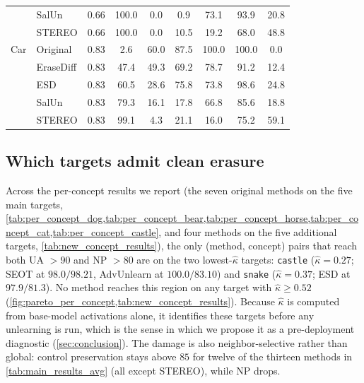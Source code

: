 \begin{table}[htbp]
{\begin{tabular}{llccccccc}
& SalUn     & 0.66 & 100.0 & 0.0 & 0.9 & 73.1 & 93.9 & 20.8 \\
& STEREO    & 0.66 & 100.0 & 0.0 & 10.5 & 19.2 & 68.0 & 48.8 \\
\midrule
Car
& Original  & 0.83 & 2.6 & 60.0 & 87.5 & 100.0 & 100.0 & 0.0 \\
& EraseDiff & 0.83 & 47.4 & 49.3 & 69.2 & 78.7 & 91.2 & 12.4 \\
& ESD       & 0.83 & 60.5 & 28.6 & 75.8 & 73.8 & 98.6 & 24.8 \\
& SalUn     & 0.83 & 79.3 & 16.1 & 17.8 & 66.8 & 85.6 & 18.8 \\
& STEREO    & 0.83 & 99.1 & 4.3 & 21.1 & 16.0 & 75.2 & 59.1 \\
\bottomrule
\end{tabular}
}
\end{table}

\subsection{Which targets admit clean erasure}\label{app:clean-erasure}
Across the per-concept results we report (the seven original methods on the
five main targets, \cref{tab:per_concept_dog,tab:per_concept_bear,tab:per_concept_horse,tab:per_concept_cat,tab:per_concept_castle}, and four methods on the five additional
targets, \cref{tab:new_concept_results}), the only (method, concept) pairs that reach both
UA $>90$ and NP $>80$ are on the two lowest-$\hat\kappa$ targets:
\texttt{castle} ($\hat\kappa=0.27$; SEOT at $98.0/98.21$, AdvUnlearn at
$100.0/83.10$) and \texttt{snake} ($\hat\kappa=0.37$; ESD at $97.9/81.3$).
No method reaches this region on any target with $\hat\kappa\geq0.52$
(\cref{fig:pareto_per_concept,tab:new_concept_results}). Because $\hat\kappa$ is computed from base-model activations alone,
it identifies these targets before any unlearning is run, which is the sense in
which we propose it as a pre-deployment diagnostic (\cref{sec:conclusion}). The damage is
also neighbor-selective rather than global: control preservation stays above
$85$ for twelve of the thirteen methods in \cref{tab:main_results_avg} (all except
STEREO), while NP drops.

